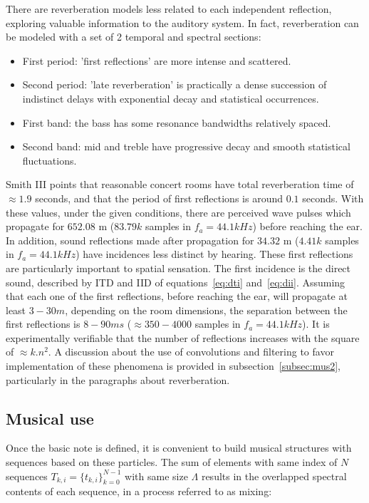 There are reverberation models less related to each independent reflection, exploring valuable information to the auditory system. In fact, reverberation can be modeled with a set of 2 temporal and spectral sections:

\begin{itemize}
   \item First period: 'first reflections' are more intense and scattered.
   \item Second period: 'late reverberation' is practically a dense succession of indistinct delays with exponential decay and statistical occurrences.
   \item First band: the bass has some resonance bandwidths relatively spaced.
   \item Second band: mid and treble have progressive decay and smooth statistical fluctuations.
\end{itemize}

Smith III points that reasonable concert rooms have total reverberation time of $\approx 1.9$ seconds, and that the period of first reflections is around $0.1$ seconds. With these values, under the given conditions, there are perceived wave pulses which propagate for $652.08$ m ($83.79k$ samples in $f_a=44.1kHz$) before reaching the ear. In addition, sound reflections made after propagation for $34.32$ m ($4.41k$ samples in $f_a=44.1kHz$) have incidences less distinct by hearing. These first reflections are particularly important to spatial sensation. The first incidence is the direct sound, described by ITD and IID of equations~\ref{eq:dti} and~\ref{eq:dii}. Assuming that each one of the first reflections, before reaching the ear, will propagate at least $3-30m$, depending on the room dimensions, the separation between the first reflections is $8-90ms$ ($\approx 350-4000$ samples in $f_a=44.1kHz$). It is experimentally verifiable that the number of reflections increases with the square of $\approx k.n^2$. A discussion about the use of convolutions and filtering to favor implementation of these phenomena is provided in subsection~\ref{subsec:mus2}, particularly in the paragraphs about reverberation.

\subsection{Musical use}\label{subsec:basMus}

Once the basic note is defined, it is convenient to build musical structures with sequences based on these particles. The sum of elements with same index of $N$ sequences $T_{k,i}=\{t_{k,i}\}_{k=0}^{N-1}$ with same size $\Lambda$ results in the overlapped spectral contents of each sequence, in a process referred to as mixing:

